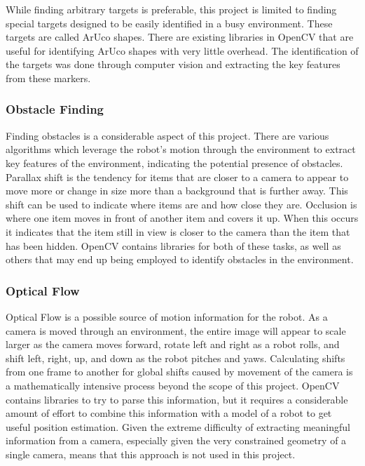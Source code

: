 \documentclass{article}[12]
\begin{document}
		While finding arbitrary targets is preferable, this project is limited to finding special targets designed to be easily identified in a busy environment. These targets are called ArUco shapes. There are existing libraries in OpenCV that are useful for identifying ArUco shapes with very little overhead. The identification of the targets was done through computer vision and extracting the key features from these markers. 
		
		\subsubsection{Obstacle Finding}
		
		Finding obstacles is a considerable aspect of this project. There are various algorithms which leverage the robot's motion through the environment to extract key features of the environment, indicating the potential presence of obstacles. Parallax shift is the tendency for items that are closer to a camera to appear to move more or change in size more than a background that is further away. This shift can be used to indicate where items are and how close they are. Occlusion is where one item moves in front of another item and covers it up. When this occurs it indicates that the item still in view is closer to the camera than the item that has been hidden. OpenCV contains libraries for both of these tasks, as well as others that may end up being employed to identify obstacles in the environment.
		
		\subsubsection{Optical Flow}
		
		Optical Flow is a possible source of motion information for the robot. As a camera is moved through an environment, the entire image will appear to scale larger as the camera moves forward, rotate left and right as a robot rolls, and shift left, right, up, and down as the robot pitches and yaws. Calculating shifts from one frame to another for global shifts caused by movement of the camera is a mathematically intensive process beyond the scope of this project. OpenCV contains libraries to try to parse this information, but it requires a considerable amount of effort to combine this information with a model of a robot to get useful position estimation. Given the extreme difficulty of extracting meaningful information from a camera, especially given the very constrained geometry of a single camera, means that this approach is not used in this project.
		
\end{document}

